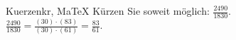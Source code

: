 \begin{MAufgabe}{Kuerzen}{kr, MaTeX}
K\"urzen Sie soweit m\"oglich: $\frac{2490}{1830}$.\\ 
\ifLsg\MLoesung
\quad $\frac{2490}{1830}=\frac{(30)\cdot(83)}{(30)\cdot(61)}=\frac{83}{61}$.\else\relax\fi
 \end{MAufgabe}
